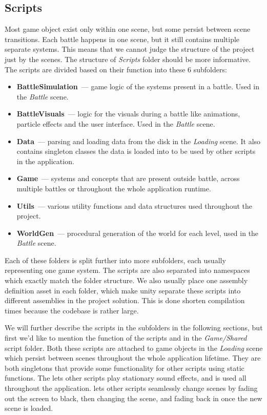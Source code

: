 \subsection{Scripts}\label{sec:docs-scripts}

Most game object exist only within one scene, but some persist between scene transitions.
Each battle happens in one scene, but it still contains multiple separate systems.
This means that we cannot judge the structure of the project just by the scenes.
The structure of \emph{Scripts} folder should be more informative.
The scripts are divided based on their function into these 6 subfolders:
\begin{itemize}
    \item \textbf{BattleSimulation}~--- game logic of the systems present in a battle. Used in the \emph{Battle} scene.
    \item \textbf{BattleVisuals}~--- logic for the visuals during a battle like animations, particle effects and the user interface. Used in the \emph{Battle} scene.
    \item \textbf{Data}~--- parsing and loading data from the disk in the \emph{Loading} scene. It also contains singleton classes the data is loaded into to be used by other scripts in the application.
    \item \textbf{Game}~--- systems and concepts that are present outside battle, across multiple battles or throughout the whole application runtime.
    \item \textbf{Utils}~--- various utility functions and data structures used throughout the project.
    \item \textbf{WorldGen}~--- procedural generation of the world for each level, used in the \emph{Battle} scene.
\end{itemize}

Each of these folders is split further into more subfolders, each usually representing one game system.
The scripts are also separated into namespaces which exactly match the folder structure.
We also usually place one assembly definition asset in each folder, which make unity separate these scripts into different assemblies in the project solution.
This is done shorten compilation times because the codebase is rather large.

We will further describe the scripts in the subfolders in the following sections, but first we'd like to mention the function of the scripts  and  in the \emph{Game/Shared} script folder.
Both these scripts are attached to game objects in the \emph{Loading} scene which persist between scenes throughout the whole application lifetime.
They are both singletons that provide some functionality for other scripts using static functions.
The  lets other scripts play stationary sound effects, and is used all throughout the application.
 lets other scripts seamlessly change scenes by fading out the screen to black, then changing the scene, and fading back in once the new scene is loaded.

